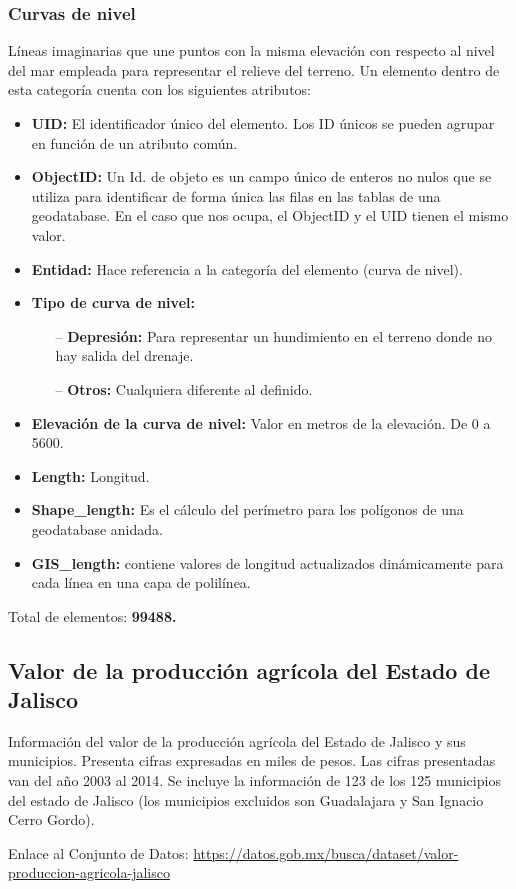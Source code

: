 \documentclass[10pt,letterpaper]{article}
\newcommand{\descripcion}{Un elemento dentro de esta categor\'ia cuenta con los siguientes atributos:}
\newcommand{\total}{Total de elementos: }
\newcommand{\UID}{\textbf{UID:} El identificador \'unico del elemento. Los ID \'unicos se pueden agrupar en funci\'on de un atributo com\'un.}
\newcommand{\OID}{\textbf{ObjectID:} Un Id. de objeto es un campo \'unico de enteros no nulos que se utiliza para identificar de forma \'unica las filas en las tablas de una geodatabase. En el caso que nos ocupa, el ObjectID y el UID tienen el mismo valor.}
\newcommand{\ent}{\textbf{Entidad:} Hace referencia a la categor\'ia del elemento }
\newcommand{\SHL}{\textbf{Shape\_length:} Es el c\'alculo del per\'imetro para los pol\'igonos de una geodatabase anidada.}
\newcommand{\GISL}{\textbf{GIS\_length:} contiene valores de longitud actualizados din\'amicamente para cada l\'inea en una capa de polil\'inea.}
\begin{document}
\subsubsection{Curvas de nivel}
L\'ineas imaginarias que une puntos con la misma elevaci\'on con respecto al nivel del mar empleada para representar el relieve del terreno. \descripcion
\begin{itemize}
	\item \UID
	\item \OID
	\item \ent (curva de nivel).
	\item \textbf{Tipo de curva de nivel:}
	\begin{itemize}
		\item[--] \textbf{Depresi\'on:} Para representar un hundimiento en el terreno donde no hay salida del drenaje.
		\item[--] \textbf{Otros:} Cualquiera diferente al definido.
	\end{itemize}
	\item \textbf{Elevaci\'on de la curva de nivel:} Valor en metros de la elevaci\'on. De 0 a 5600.
	\item \textbf{Length:} Longitud.
	\item \SHL
	\item \GISL
\end{itemize}
\total \textbf{99488.}

\subsection{Valor de la producci\'on agr\'icola del Estado de Jalisco}

Informaci\'on del valor de la producci\'on agr\'icola del Estado de Jalisco y sus municipios. Presenta cifras expresadas en miles de pesos. Las cifras presentadas van del a\~no 2003 al 2014. Se incluye la informaci\'on de 123 de los 125 municipios del estado de Jalisco (los municipios excluidos son Guadalajara y San Ignacio Cerro Gordo).

Enlace al Conjunto de Datos:
\url{https://datos.gob.mx/busca/dataset/valor-produccion-agricola-jalisco}
\end{document}
